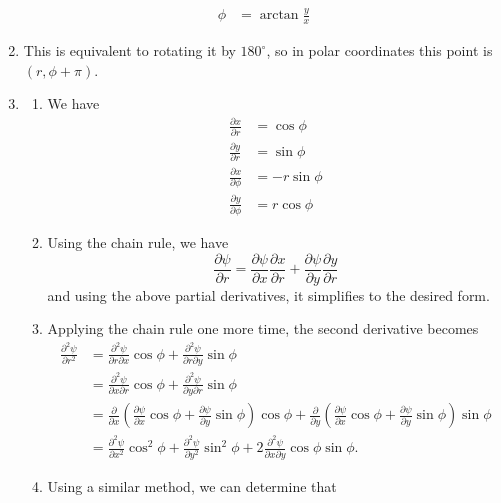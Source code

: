 \documentclass{article}
\begin{document}
\begin{enumerate}[label=(8.\arabic*)]
\begin{align*}
        \phi &= \arctan \frac{y}{x}
    \end{align*}
    \item This is equivalent to rotating it by $180^\circ$, so in polar coordinates this point is $(r,\phi+\pi).$
    \setcounter{enumi}{18}
    \item \begin{enumerate}
        \item We have
        \begin{align*}
            \frac{\partial x}{\partial r} &= \cos\phi \\ 
            \frac{\partial y}{\partial r} &= \sin\phi \\ 
            \frac{\partial x}{\partial \phi} &= -r\sin\phi \\
            \frac{\partial y}{\partial \phi} &= r\cos\phi
        \end{align*}
        \item Using the chain rule, we have
        \begin{equation*}
            \frac{\partial \psi}{\partial r} = \frac{\partial \psi}{\partial x}\frac{\partial x}{\partial r} + \frac{\partial \psi}{\partial y}\frac{\partial y}{\partial r}
        \end{equation*}
        and using the above partial derivatives, it simplifies to the desired form.
        \item Applying the chain rule one more time, the second derivative becomes 
        \begin{align*}
            \frac{\partial^2\psi}{\partial r^2} &= \frac{\partial^2 \psi}{\partial r\partial x}\cos\phi + \frac{\partial^2\psi}{\partial r\partial y}\sin\phi \\ 
            &=\frac{\partial^2 \psi}{\partial x\partial r}\cos\phi + \frac{\partial^2\psi}{\partial y\partial r}\sin\phi \\ 
            &= \frac{\partial}{\partial x}\left(\frac{\partial \psi}{\partial x}\cos\phi + \frac{\partial \psi}{\partial y}\sin\phi\right)\cos\phi + \frac{\partial}{\partial y}\left(\frac{\partial \psi}{\partial x}\cos\phi + \frac{\partial \psi}{\partial y}\sin\phi\right)\sin\phi \\ 
            &= \frac{\partial^2 \psi}{\partial x^2} \cos^2\phi + \frac{\partial^2 \psi}{\partial y^2}\sin^2\phi + 2\frac{\partial^2\psi}{\partial x\partial y}\cos\phi\sin\phi.
        \end{align*}
        \item Using a similar method, we can determine that 

\end{enumerate}
\end{enumerate}
\end{document}
